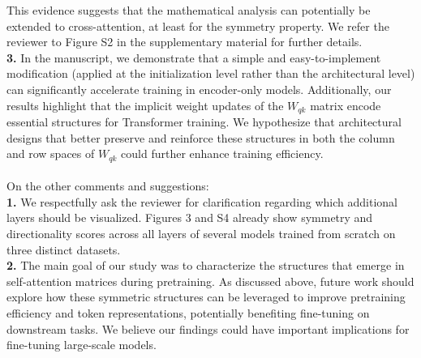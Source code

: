\documentclass[11pt]{article}
\begin{document}
This evidence suggests that the mathematical analysis can potentially be extended to cross-attention, at least for the symmetry property. We refer the reviewer to Figure S2 in the supplementary material for further details.
%
\\
%
\textbf{3.} In the manuscript, we demonstrate that a simple and easy-to-implement modification (applied at the initialization level rather than the architectural level) can significantly accelerate training in encoder-only models.  Additionally, our results highlight that the implicit weight updates of the $W_{qk}$ matrix encode essential structures for Transformer training. We hypothesize that architectural designs that better preserve and reinforce these structures in both the column and row spaces of $W_{qk}$ could further enhance training efficiency.
%
\\\\
%
On the other comments and suggestions:
%
\\
%
\textbf{1.} We respectfully ask the reviewer for clarification regarding which additional layers should be visualized. Figures 3 and S4 already show symmetry and directionality scores across all layers of several models trained from scratch on three distinct datasets. %
%
\\
\textbf{2.} The main goal of our study was to characterize the structures that emerge in self-attention matrices during pretraining. 
As discussed above, future work should explore how these symmetric structures can be leveraged to improve pretraining efficiency and token representations, potentially benefiting fine-tuning on downstream tasks. We believe our findings could have important implications for fine-tuning large-scale models.
%
\end{document}
